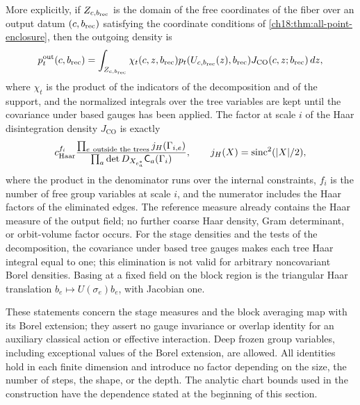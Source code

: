 \begin{theorem}
More explicitly, if $Z_{c,b_{\mathrm{rec}}}$ is the domain of the free coordinates of the fiber over an output datum $(c,b_{\mathrm{rec}})$ satisfying the coordinate conditions of \cref{ch18:thm:all-point-enclosure}, then the outgoing density is
\[
 p_t^{\mathrm{out}}(c,b_{\mathrm{rec}})=
 \int_{Z_{c,b_{\mathrm{rec}}}}\chi_t(c,z,b_{\mathrm{rec}})
       p_t(U_{c,b_{\mathrm{rec}}}(z),b_{\mathrm{rec}})J_{\mathrm{CO}}(c,z;b_{\mathrm{rec}})\,dz,
\]
where $\chi_t$ is the product of the indicators of the decomposition and of the support, and the normalized integrals over the tree variables are kept until the covariance under based gauges has been applied. The factor at scale $i$ of the Haar disintegration density $J_{\mathrm{CO}}$ is exactly
\[
 c_{\mathrm{Haar}}^{f_i}
 \frac{\prod_{e\ \text{outside the trees}}j_H(\Gamma_{i,e})}
 {\prod_{a}\det D_{X_{e^*_a}}\mathsf C_a(\Gamma_i)},
 \qquad j_H(X)=\operatorname{sinc}^2(\lvert X\rvert/2),
\]
where the product in the denominator runs over the internal constraints, $f_i$ is the number of free group variables at scale $i$, and the numerator includes the Haar factors of the eliminated edges. The reference measure already contains the Haar measure of the output field; no further coarse Haar density, Gram determinant, or orbit-volume factor occurs. For the stage densities and the tests of the decomposition, the covariance under based tree gauges makes each tree Haar integral equal to one; this elimination is not valid for arbitrary noncovariant Borel densities. Basing at a fixed field on the block region is the triangular Haar translation $b_e\mapsto U(\sigma_e)b_e$, with Jacobian one.

These statements concern the stage measures and the block averaging map with its Borel extension; they assert no gauge invariance or overlap identity for an auxiliary classical action or effective interaction. Deep frozen group variables, including exceptional values of the Borel extension, are allowed. All identities hold in each finite dimension and introduce no factor depending on the size, the number of steps, the shape, or the depth. The analytic chart bounds used in the construction have the dependence stated at the beginning of this section.
\end{theorem}

